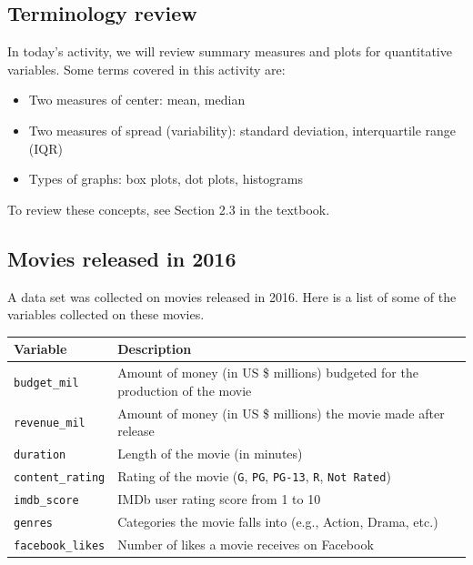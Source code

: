 \documentclass[
]{report}
\begin{document}
\hypertarget{terminology-review-6}{%
\subsection{Terminology review}\label{terminology-review-6}}

In today's activity, we will review summary measures and plots for quantitative variables. Some terms covered in this activity are:

\begin{itemize}
\item
  Two measures of center: mean, median
\item
  Two measures of spread (variability): standard deviation, interquartile range (IQR)
\item
  Types of graphs: box plots, dot plots, histograms
\end{itemize}

To review these concepts, see Section 2.3 in the textbook.

\hypertarget{movies-released-in-2016}{%
\subsection{Movies released in 2016}\label{movies-released-in-2016}}

A data set was collected on movies released in 2016. Here is a list of some of the variables collected on these movies.

\begin{longtable}[]{@{}
  >{\raggedright\arraybackslash}p{}
  >{\raggedright\arraybackslash}p{}@{}}
\toprule
\textbf{Variable} & \textbf{Description} \\
\midrule
\endhead
\texttt{budget\_mil} & Amount of money (in US \$ millions) budgeted for the production of the movie \\
\texttt{revenue\_mil} & Amount of money (in US \$ millions) the movie made after release \\
\texttt{duration} & Length of the movie (in minutes) \\
\texttt{content\_rating} & Rating of the movie (\texttt{G}, \texttt{PG}, \texttt{PG-13}, \texttt{R}, \texttt{Not\ Rated}) \\
\texttt{imdb\_score} & IMDb user rating score from 1 to 10 \\
\texttt{genres} & Categories the movie falls into (e.g., Action, Drama, etc.) \\
\texttt{facebook\_likes} & Number of likes a movie receives on Facebook \\
\bottomrule
\end{longtable}
\end{document}
